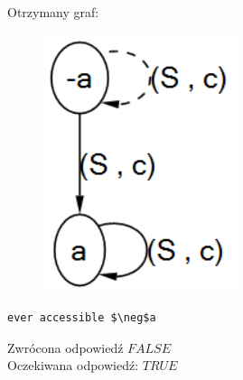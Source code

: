 \documentclass{article}
\begin{document}
Otrzymany graf:
\begin{figure}[H]
	\centering
	\includegraphics[scale=0.6]{test7_graf}
\end{figure}

\begin{lstlisting}[mathescape=true]
ever accessible $\neg$a
\end{lstlisting}
Zwrócona odpowiedź $FALSE$\\
Oczekiwana odpowiedź: $TRUE$


\newpage
\end{document}

